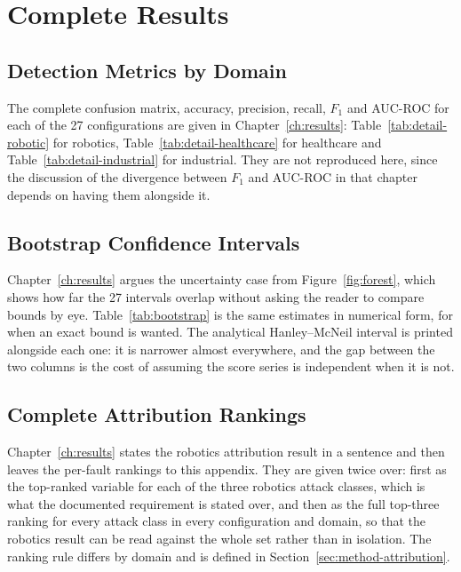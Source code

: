 %
\chapter{Complete Results}
\label{app:full-results}

\section{Detection Metrics by Domain}

The complete confusion matrix, accuracy, precision, recall, $F_1$ and AUC-ROC for each of the 27 configurations are given in Chapter~\ref{ch:results}: Table~\ref{tab:detail-robotic} for robotics, Table~\ref{tab:detail-healthcare} for healthcare and Table~\ref{tab:detail-industrial} for industrial. They are not reproduced here, since the discussion of the divergence between $F_1$ and AUC-ROC in that chapter depends on having them alongside it.

\section{Bootstrap Confidence Intervals}

Chapter~\ref{ch:results} argues the uncertainty case from Figure~\ref{fig:forest}, which shows how far the 27 intervals overlap without asking the reader to compare bounds by eye. Table~\ref{tab:bootstrap} is the same estimates in numerical form, for when an exact bound is wanted. The analytical Hanley--McNeil interval is printed alongside each one: it is narrower almost everywhere, and the gap between the two columns is the cost of assuming the score series is independent when it is not.



\section{Complete Attribution Rankings}

Chapter~\ref{ch:results} states the robotics attribution result in a sentence and then leaves the per-fault rankings to this appendix. They are given twice over: first as the top-ranked variable for each of the three robotics attack classes, which is what the documented requirement is stated over, and then as the full top-three ranking for every attack class in every configuration and domain, so that the robotics result can be read against the whole set rather than in isolation. The ranking rule differs by domain and is defined in Section~\ref{sec:method-attribution}.


